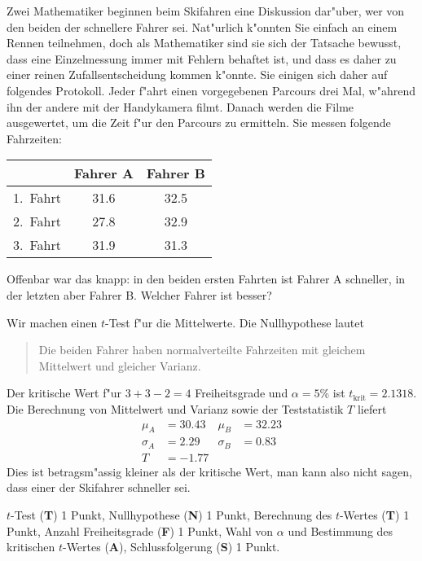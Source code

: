 Zwei Mathematiker beginnen beim Skifahren eine Diskussion dar"uber, 
wer von den beiden der schnellere Fahrer sei.
Nat"urlich k"onnten Sie einfach an einem Rennen teilnehmen, doch
als Mathematiker sind sie sich der Tatsache bewusst, dass eine
Einzelmessung immer mit Fehlern behaftet ist, und dass es daher
zu einer reinen Zufallsentscheidung kommen k"onnte. Sie einigen sich daher
auf folgendes Protokoll. Jeder f"ahrt einen vorgegebenen Parcours
drei Mal, w"ahrend ihn der andere mit der Handykamera filmt.
Danach werden die Filme ausgewertet, um die Zeit f"ur den Parcours
zu ermitteln. Sie messen folgende Fahrzeiten:
\begin{center}
\begin{tabular}{|l|c|c|}
\hline
        &Fahrer A&Fahrer B\\
\hline
1.~Fahrt&  31.6  &  32.5  \\
2.~Fahrt&  27.8  &  32.9  \\
3.~Fahrt&  31.9  &  31.3  \\
\hline
\end{tabular}
\end{center}
Offenbar war das knapp: in den beiden ersten Fahrten ist Fahrer A schneller,
in der letzten aber Fahrer B.
Welcher Fahrer ist besser?

\begin{loesung}
Wir machen einen $t$-Test f"ur die Mittelwerte.
Die Nullhypothese lautet
\begin{quote}
Die beiden Fahrer haben normalverteilte Fahrzeiten mit gleichem
Mittelwert und gleicher Varianz.
\end{quote}
Der kritische Wert f"ur $3+3-2=4$ Freiheitsgrade und $\alpha=5\%$
ist $t_{\text{krit}}=2.1318$.
Die Berechnung von Mittelwert und Varianz sowie der Teststatistik $T$
liefert
\begin{align*}
\mu_A&=30.43
&
\mu_B&=32.23
\\
\sigma_A&=2.29
&
\sigma_B&=0.83
\\
T&=-1.77
\end{align*}
Dies ist betragsm"assig kleiner als der kritische Wert,
man kann also nicht sagen, dass einer der Skifahrer schneller sei.
\end{loesung}

\begin{bewertung}
$t$-Test ({\bf T}) 1 Punkt,
Nullhypothese ({\bf N}) 1 Punkt,
Berechnung des $t$-Wertes ({\bf T}) 1 Punkt,
Anzahl Freiheitsgrade ({\bf F}) 1 Punkt,
Wahl von $\alpha$ und Bestimmung des kritischen $t$-Wertes ({\bf A}),
Schlussfolgerung ({\bf S}) 1 Punkt.
\end{bewertung}

